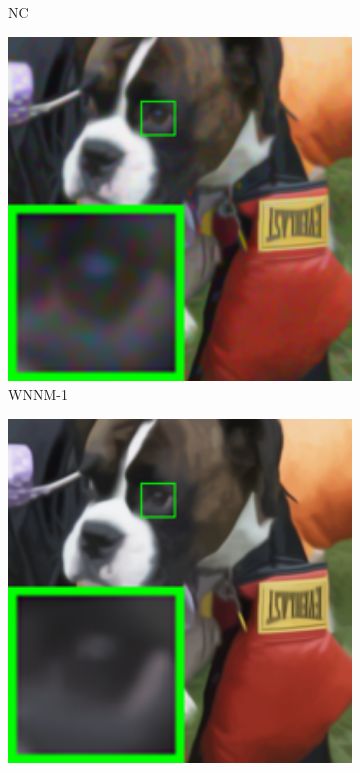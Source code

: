 \begin{figure}
\begin{subfigure}[t]{0.19\textwidth}
		\caption{NC}
    \end{subfigure}
    \hfill
    \begin{subfigure}[t]{0.19\textwidth}
        \centering
        \includegraphics[width=1\textwidth]{images/mcwnnm/nc/resize_br_WNNMcw_dog.png}
		\caption{WNNM-1}
    \end{subfigure}
    \hfill
    \begin{subfigure}[t]{0.19\textwidth}
        \centering
        \includegraphics[width=1\textwidth]{images/mcwnnm/nc/resize_br_WNNMJ_dog.png}

\end{subfigure}
\end{figure}
